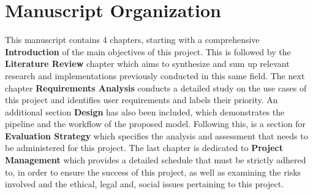 \section{Manuscript Organization}

This manuscript contains 4 chapters, starting with a comprehensive \textbf{Introduction} 
of the main objectives of this project. This is followed by the 
\textbf{Literature Review} chapter which aims to synthesize and sum up relevant research and implementations previously conducted in this same field. 
The next chapter \textbf{Requirements Analysis} conducts a detailed study on the use cases of this project and identifies user requirements and labels their priority. An additional section \textbf{Design} 
has also been included, which demonstrates the pipeline and the workflow of the proposed model.
Following this, is a section for \textbf{Evaluation Strategy} which specifies the analysis and assessment that needs to be administered for this project. The last chapter is dedicated to \textbf{Project Management} which provides a detailed schedule that must be strictly adhered to, in order to ensure the success of this project, as well as examining the risks involved and the ethical, legal and, social issues pertaining to this project.